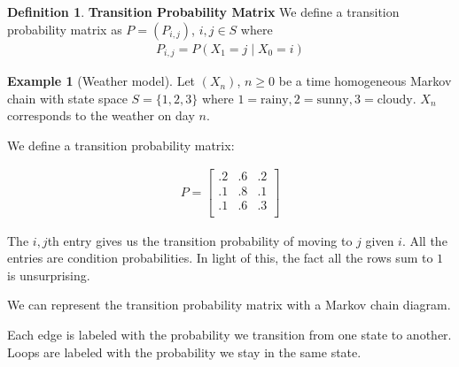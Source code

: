 \documentclass[12pt]{article}
\theoremstyle{definition}
\newtheorem{definition}{Definition}[section]
\newtheorem{example}{Example}[section]
\begin{document}
\theoremstyle{definition}
\begin{definition}{\textbf{Transition Probability Matrix}}
We define a transition probability matrix as $P = (P_{i,j})$, $i,j \in S$ where
\begin{align*}
  P_{i,j}= P(X_1 = j \mid X_0 = i)
\end{align*}


\begin{example}[Weather model]
Let $(X_n)$, $n \geq 0$ be a time homogeneous Markov chain with state space $S = \{1,2,3\}$ where $1= \text{rainy}, 2 = \text{sunny}, 3 = \text{cloudy}$. $X_n$ corresponds to the weather on day $n$.

We define a transition probability matrix:

\begin{align*}
  P =
  \begin{bmatrix}
  .2 & .6 & .2 \\
  .1 & .8 & .1 \\
  .1 & .6 & .3 \\
\end{bmatrix}
\end{align*}

The $i,j$th entry gives us the transition probability of moving to $j$ given $i$. All the entries are condition probabilities. In light of this, the fact all the rows sum to $1$ is unsurprising.

We can represent the transition probability matrix with a Markov chain diagram.

\begin{center}


\end{center}

Each edge is labeled with the probability we transition from one state to another. Loops are labeled with the probability we stay in the same state.

\end{example}

\end{definition}
\end{document}
